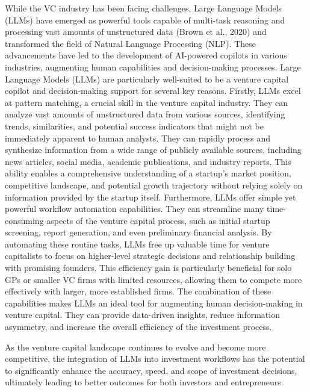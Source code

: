 \documentclass[a4paper, oneside]{discothesis}
\begin{document}
While the VC industry has been facing challenges, Large Language Models (LLMs) have emerged as powerful tools capable of multi-task reasoning and processing vast amounts of
unstructured data (Brown et al., 2020) and transformed the field of Natural Language Processing (NLP). These advancements have led to the development of
AI-powered copilots in various industries, augmenting human capabilities and decision-making processes.
 Large Language Models (LLMs) are particularly well-suited to be a venture capital copilot and decision-making support for several key reasons. 
Firstly, LLMs excel at pattern matching, a crucial skill in the venture capital industry. They can analyze vast amounts of unstructured data from various sources, 
identifying trends, similarities, and potential success indicators that might not be immediately apparent to human analysts.
They can rapidly process and synthesize information from a wide range of publicly available sources, including news articles, social media, academic publications, 
and industry reports. This ability enables a comprehensive understanding of a startup's market position, competitive landscape, and potential growth trajectory 
without relying solely on information provided by the startup itself.
Furthermore, LLMs offer simple yet powerful workflow automation capabilities. They can streamline many time-consuming aspects of the venture capital process, 
such as initial startup screening, report generation, and even preliminary financial analysis. By automating these routine tasks, LLMs free up valuable time 
for venture capitalists to focus on higher-level strategic decisions and relationship building with promising founders. This efficiency gain is particularly 
beneficial for solo GPs or smaller VC firms with limited resources, allowing them to compete more effectively with larger, more established firms.
The combination of these capabilities makes LLMs an ideal tool for augmenting human decision-making in venture capital. They can provide data-driven insights,
 reduce information asymmetry, and increase the overall efficiency of the investment process. 
 
 As the venture capital landscape continues to evolve and 
 become more competitive, the integration of LLMs into investment workflows has the potential to significantly enhance the accuracy, speed, and scope of investment decisions, ultimately leading to better outcomes for both investors and entrepreneurs.
\end{document}
